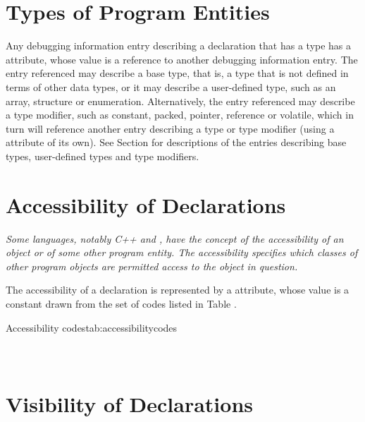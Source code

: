 \section{Types of Program Entities}
\label{chap:typesofprogramentities}
Any 
\hypertarget{chap:DWATtypetypeofdeclaration}{}
debugging information entry describing a declaration that
has a type has 
a \DWATtype{} attribute, whose value is a
reference to another debugging information entry. The entry
referenced may describe a base type, that is, a type that is
not defined in terms of other data types, or it may describe a
user-defined type, such as an array, structure or enumeration.
Alternatively, the entry referenced may describe a type
modifier, such as constant, packed, pointer, reference or
volatile, which in turn will reference another entry describing
a type or type modifier (using 
a \DWATtype{} attribute of its
own). See 
Section   
for descriptions of the entries describing
base types, user-defined types and type modifiers.



\section{Accessibility of Declarations}
\label{chap:accessibilityofdeclarations}
\textit{Some languages, notably C++ and 
, have the concept of
the accessibility of an object or of some other program
entity. The accessibility specifies which classes of other
program objects are permitted access to the object in question.}

The accessibility of a declaration is 
\hypertarget{chap:DWATaccessibilitycandadadeclarations}{}
represented by a 
\DWATaccessibility{} 
attribute, whose
value is a constant drawn from the set of codes listed in Table 
.

\begin{simplenametable}[1.9in]{Accessibility codes}{tab:accessibilitycodes}
\DWACCESSpublicTARG{}          \\
\DWACCESSprivateTARG{}        \\
\DWACCESSprotectedTARG{}    \\
\end{simplenametable}

\section{Visibility of Declarations}
\label{chap:visibilityofdeclarations}


